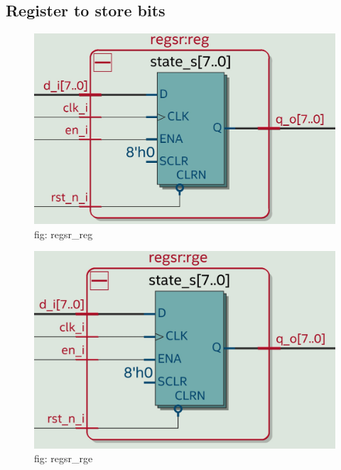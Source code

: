 \documentclass[12pt,a4 paper] {report}
\begin{document}
\subsection{Register to store bits}
\begin{figure}[h]
	\centering	
	\includegraphics[scale=0.1]{../png/regsr_reg.png}
	\newline
	fig: regsr\_reg\\
\end{figure}
\begin{figure}[h]
	\centering	
	\includegraphics[scale=0.1]{../png/regsr_rge.png}
	\newline
	fig: regsr\_rge\\
\end{figure}
\newpage
\end{document}
